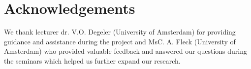 \section {Acknowledgements}
We thank lecturer dr. V.O. Degeler (University of Amsterdam) for providing guidance and assistance during the project and MsC. A. Fleck (University of Amsterdam) who provided valuable feedback and answered our questions during the seminars which helped us further expand our research. 